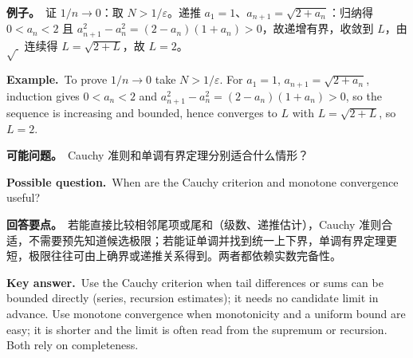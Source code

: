 \documentclass[UTF8,11pt,a4paper]{ctexart}
\newcommand{\EX}[2]{\par\noindent\textbf{例子。}\ #1\par\noindent\textbf{Example.}\ #2\par}
\newcommand{\ASK}[4]{\begin{samepage}\par\noindent\textbf{可能问题。}\ #1\par\noindent\textbf{Possible question.}\ #2\par\noindent\textbf{回答要点。}\ #3\par\noindent\textbf{Key answer.}\ #4\medskip\end{samepage}}
\begin{document}
\EX{证 $1/n\to0$：取 $N>1/\varepsilon$。递推 $a_1=1$、$a_{n+1}=\sqrt{2+a_n}$：归纳得 $0<a_n<2$ 且 $a_{n+1}^2-a_n^2=(2-a_n)(1+a_n)>0$，故递增有界，收敛到 $L$，由 $\sqrt{\ }$ 连续得 $L=\sqrt{2+L}$，故 $L=2$。}{To prove $1/n\to0$ take $N>1/\varepsilon$. For $a_1=1$, $a_{n+1}=\sqrt{2+a_n}$, induction gives $0<a_n<2$ and $a_{n+1}^2-a_n^2=(2-a_n)(1+a_n)>0$, so the sequence is increasing and bounded, hence converges to $L$ with $L=\sqrt{2+L}$, so $L=2$.}
\ASK{Cauchy 准则和单调有界定理分别适合什么情形？}{When are the Cauchy criterion and monotone convergence useful?}{若能直接比较相邻尾项或尾和（级数、递推估计），Cauchy 准则合适，不需要预先知道候选极限；若能证单调并找到统一上下界，单调有界定理更短，极限往往可由上确界或递推关系得到。两者都依赖实数完备性。}{Use the Cauchy criterion when tail differences or sums can be bounded directly (series, recursion estimates); it needs no candidate limit in advance. Use monotone convergence when monotonicity and a uniform bound are easy; it is shorter and the limit is often read from the supremum or recursion. Both rely on completeness.}
\end{document}
